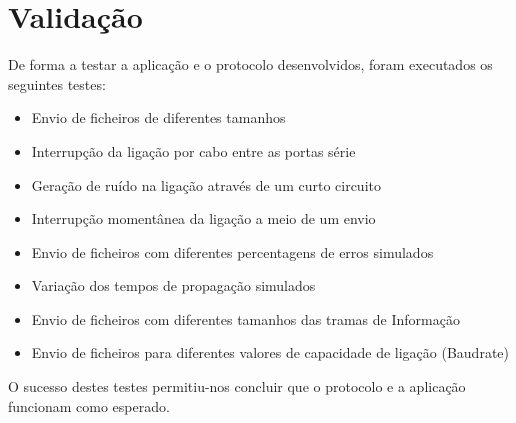 \section{Validação}

De forma a testar a aplicação e o protocolo desenvolvidos, foram executados os seguintes testes:

\begin{itemize}
    \item Envio de ficheiros de diferentes tamanhos
    \item Interrupção da ligação por cabo entre as portas série
    \item Geração de ruído na ligação através de um curto circuito
    \item Interrupção momentânea da ligação a meio de um envio
    \item Envio de ficheiros com diferentes percentagens de erros simulados
    \item Variação dos tempos de propagação simulados
    \item Envio de ficheiros com diferentes tamanhos das tramas de Informação
    \item Envio de ficheiros para diferentes valores de capacidade de ligação (Baudrate)
\end{itemize}

O sucesso destes testes permitiu-nos concluir que o protocolo e a aplicação funcionam como esperado.